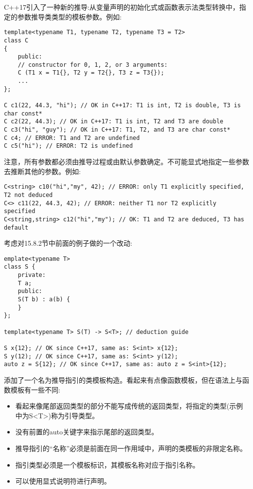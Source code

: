 
C++17引入了一种新的推导:从变量声明的初始化式或函数表示法类型转换中，指定的参数推导类类型的模板参数。例如:

\begin{lstlisting}[style=styleCXX]
template<typename T1, typename T2, typename T3 = T2>
class C
{
	public:
	// constructor for 0, 1, 2, or 3 arguments:
	C (T1 x = T1{}, T2 y = T2{}, T3 z = T3{});
	...
};

C c1(22, 44.3, "hi"); // OK in C++17: T1 is int, T2 is double, T3 is char const*
C c2(22, 44.3); // OK in C++17: T1 is int, T2 and T3 are double
C c3("hi", "guy"); // OK in C++17: T1, T2, and T3 are char const*
C c4; // ERROR: T1 and T2 are undefined
C c5("hi"); // ERROR: T2 is undefined
\end{lstlisting}

注意，所有参数都必须由推导过程或由默认参数确定。不可能显式地指定一些参数去推断其他的参数。例如:

\begin{lstlisting}[style=styleCXX]
C<string> c10("hi","my", 42); // ERROR: only T1 explicitly specified, T2 not deduced
C<> c11(22, 44.3, 42); // ERROR: neither T1 nor T2 explicitly specified
C<string,string> c12("hi","my"); // OK: T1 and T2 are deduced, T3 has default
\end{lstlisting}


考虑对15.8.2节中前面的例子做的一个改动:

\begin{lstlisting}[style=styleCXX]
emplate<typename T>
class S {
	private:
	T a;
	public:
	S(T b) : a(b) {
	}
};

template<typename T> S(T) -> S<T>; // deduction guide

S x{12}; // OK since C++17, same as: S<int> x{12};
S y(12); // OK since C++17, same as: S<int> y(12);
auto z = S{12}; // OK since C++17, same as: auto z = S<int>{12};
\end{lstlisting}

添加了一个名为推导指引的类模板构造。看起来有点像函数模板，但在语法上与函数模板有一些不同:

\begin{itemize}
\item 
看起来像尾部返回类型的部分不能写成传统的返回类型，将指定的类型(示例中为S<T>)称为引导类型。

\item 
没有前置的auto关键字来指示尾部的返回类型。

\item 
推导指引的“名称”必须是前面在同一作用域中，声明的类模板的非限定名称。

\item 
指引类型必须是一个模板标识，其模板名称对应于指引名称。

\item 
可以使用显式说明符进行声明。
\end{itemize}	

